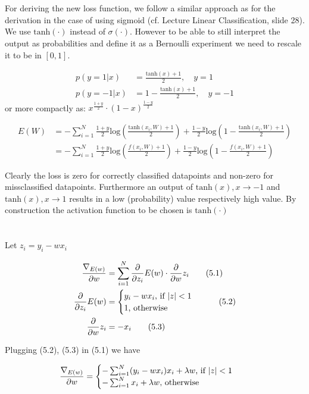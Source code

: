\documentclass[11pt]{article}
\newcommand{\exercise}{\section{}}
\newcommand{\sumf}[3]{\sum_{#1}^{#2} #3}
\newcommand{\ifelse}[4]{%
\begingroup
\begin{cases}
  {#1} \text{, if {#2}} \\
  {#3} \text{, otherwise {#4}}
\end{cases}
\endgroup
}
\newcommand{\gradf}[2]{\frac{\nabla_{#1}}{{\partial #2}}}
\newcommand{\partialf}[1]{\frac{\partial}{{\partial #1}}}
\begin{document}
\exercise

For deriving the new loss function, we follow a similar approach as for the derivation in the case of using sigmoid (cf. Lecture Linear Classification, slide 28). We use $ \text{tanh}( \cdot ) $ instead of $\sigma( \cdot )$. However to be able to still interpret the output as probabilities and define it as a Bernoulli experiment we need to rescale it to be in $[0, 1]$.

\begin{align*}
p( y = 1 | x) &=\frac{\text{tanh}(x) + 1}{2}, \quad y = 1 \\
p( y = -1 | x) &=1 - \frac{\text{tanh}(x) + 1}{2}, \quad y = -1
\end{align*}
or more compactly as:
$x^{\frac{1 + y}{2}} \cdot (1 - x)^{\frac{1 - y}{2}}$

\begin{align*}
E(W) &= -\sumf{i = 1}{N}{ \frac{1 + y}{2} \text{log}(\frac{\text{tanh}(x_i, W) + 1}{2}) + \frac{1 - y}{2} \text{log}(1 - \frac{\text{tanh}(x_i, W) + 1}{2})} \\
&= -\sumf{i = 1}{N}{ \frac{1 + y}{2} \text{log}(\frac{f(x_i, W) + 1}{2}) + \frac{1 - y}{2} \text{log}(1 - \frac{f(x_i, W) + 1}{2})}
\end{align*}

\noindent Clearly the loss is zero for correctly classified datapoints and non-zero for missclassified datapoints. Furthermore an output of $\text{tanh}(x), x \rightarrow -1$ and  $\text{tanh}(x), x \rightarrow 1$ results in a low (probability) value respectively high value. By construction the activation function to be chosen is $\text{tanh}(\cdot)$

\exercise

Let $z_i = y_i - w x_i$

\begin{align*}
\gradf{E(w)}{w} &= \sumf{i=1}{N}{\partialf{z_i}E(w) \cdot \partialf{w}z_i} \tag{5.1} \\
\partialf{z_i}E(w) &= \ifelse{y_i - w x_i}{$\vert z \vert < 1$}{1}{} \tag{5.2} \\
\partialf{w}z_i &= -x_i \tag{5.3}
\end{align*}

\noindent Plugging (5.2), (5.3) in (5.1) we have

\begin{align*}
\gradf{E(w)}{w} &= \ifelse{-\sumf{i=1}{N}{ (y_i - w x_i) x_i} + \lambda w}{$\vert z \vert < 1$}{-\sumf{i=1}{N}{x_i} + \lambda w}{}
\end{align*}
\end{document}
